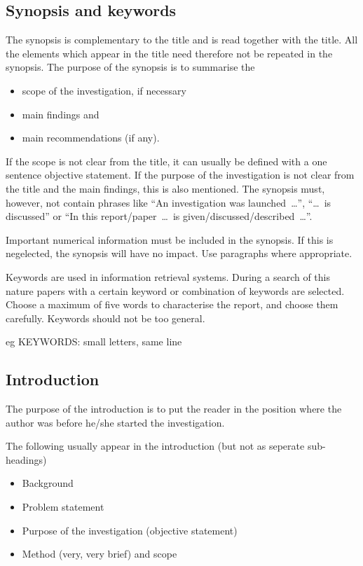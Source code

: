 \documentclass[a5paper, 10pt]{article}
\begin{document}
\subsection{Synopsis and keywords}
\label{sec:synopsis-keywords}
The synopsis is complementary to the title and is read together with
the title.  All the elements which appear in the title need therefore
not be repeated in the synopsis.  The purpose of the synopsis is to
summarise the
\begin{itemize}
\item scope of the investigation, if necessary
\item main findings and
\item main recommendations (if any).  
\end{itemize}
If the scope is not clear from the title, it can usually be defined
with a one sentence objective statement.  If the purpose of the
investigation is not clear from the title and the main findings, this
is also mentioned.  The synopsis must, however, not contain phrases
like ``An investigation was launched~\dots'', ``\dots~is discussed'' or
``In this report/paper~\dots~is given/discussed/described~\dots''.

Important numerical information must be included in the synopsis.  
If this is negelected, the synopsis will have no impact.
Use paragraphs where appropriate.

Keywords are used in information retrieval systems.  
During a search of this nature papers with a certain keyword or combination of
keywords are selected.  
Choose a maximum of five words to characterise the report, and choose them carefully.  
Keywords should not be too general.

eg KEYWORDS:   small letters, same line

\subsection{Introduction}
\label{sec:introduction}
The purpose of the introduction is to put the reader in the position
where the author was before he/she started the investigation.

The following usually appear in the introduction (but not as seperate sub-headings)
\begin{itemize}
\item Background
\item Problem statement
\item Purpose of the investigation (objective statement)
\item Method (very, very brief) and scope
\end{itemize}
\end{document}
